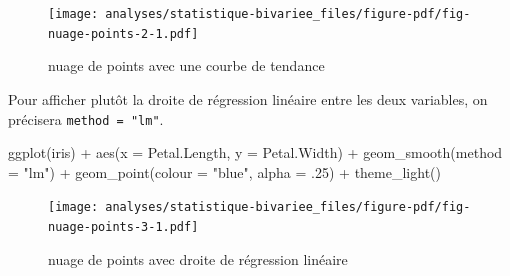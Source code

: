 \documentclass[
  letterpaper,
  DIV=11,
  numbers=noendperiod,
  oneside]{scrreprt}
\newenvironment{Shaded}{\begin{snugshade}}{\end{snugshade}}
\newcommand{\AttributeTok}[1]{\textcolor[rgb]{0.40,0.45,0.13}{#1}}
\newcommand{\DecValTok}[1]{\textcolor[rgb]{0.68,0.00,0.00}{#1}}
\newcommand{\FunctionTok}[1]{\textcolor[rgb]{0.28,0.35,0.67}{#1}}
\newcommand{\NormalTok}[1]{\textcolor[rgb]{0.00,0.23,0.31}{#1}}
\newcommand{\SpecialCharTok}[1]{\textcolor[rgb]{0.37,0.37,0.37}{#1}}
\newcommand{\StringTok}[1]{\textcolor[rgb]{0.13,0.47,0.30}{#1}}
\begin{document}
\begin{figure}[H]

{\centering \texttt{[image: analyses/statistique-bivariee\_files/figure-pdf/fig-nuage-points-2-1.pdf]}

}

\caption{\label{fig-nuage-points-2}nuage de points avec une courbe de
tendance}

\end{figure}

Pour afficher plutôt la droite de régression linéaire entre les deux
variables, on précisera \texttt{method\ =\ "lm"}.

\begin{Shaded}
\begin{Highlighting}[]
\FunctionTok{ggplot}\NormalTok{(iris) }\SpecialCharTok{+}
  \FunctionTok{aes}\NormalTok{(}\AttributeTok{x =}\NormalTok{ Petal.Length, }\AttributeTok{y =}\NormalTok{ Petal.Width) }\SpecialCharTok{+}
  \FunctionTok{geom\_smooth}\NormalTok{(}\AttributeTok{method =} \StringTok{"lm"}\NormalTok{) }\SpecialCharTok{+}
  \FunctionTok{geom\_point}\NormalTok{(}\AttributeTok{colour =} \StringTok{"blue"}\NormalTok{, }\AttributeTok{alpha =}\NormalTok{ .}\DecValTok{25}\NormalTok{) }\SpecialCharTok{+}
  \FunctionTok{theme\_light}\NormalTok{()}
\end{Highlighting}
\end{Shaded}

\begin{figure}[H]

{\centering \texttt{[image: analyses/statistique-bivariee\_files/figure-pdf/fig-nuage-points-3-1.pdf]}

}

\caption{\label{fig-nuage-points-3}nuage de points avec droite de
régression linéaire}

\end{figure}
\end{document}
